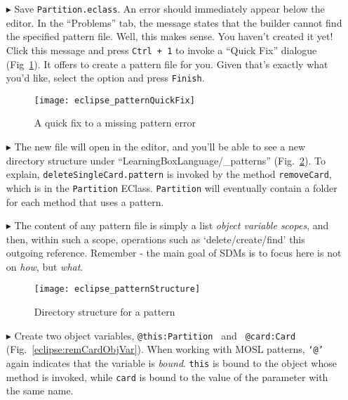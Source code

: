 \begin{itemize}
\item[$\blacktriangleright$] Save \texttt{Partition.eclass}. An error should immediately appear below the editor. In the ``Problems'' tab, the message
states that the builder cannot find the specified pattern file. Well, this makes sense. You haven't created it yet! Click this message and press \texttt{Ctrl +
1} to invoke a ``Quick Fix'' dialogue (Fig~\ref{eclipse:quickFix}). It offers to create a pattern file for you. Given that's exactly what you'd like, select the
option and press \texttt{Finish}.

\vspace{0.5cm}

\begin{figure}[htp]
\begin{center}
  \texttt{[image: eclipse\_patternQuickFix]}
  \caption{A quick fix to a missing pattern error}
  \label{eclipse:quickFix}
\end{center}
\end{figure}

\item[$\blacktriangleright$] The new file will open in the editor, and you'll be able to see a new directory structure under ``LearningBoxLanguage/\_patterns''
(Fig.~\ref{eclipse:pattStruct}). To explain, \texttt{deleteSingleCard.pattern} is invoked by the method \texttt{removeCard}, which is in the \texttt{Partition}
EClass. \texttt{Partition} will eventually contain a folder for each method that uses a pattern.

\vspace{0.5cm}

\item[$\blacktriangleright$] The content of any pattern file is simply a list \emph{object variable scopes}, and then,
within such a scope, operations such as `delete/create/find' this outgoing reference. Remember - the main goal of SDMs is to focus here is not on \emph{how},
but \emph{what}.

\newpage

\begin{figure}[htp]
\begin{center}
  \texttt{[image: eclipse\_patternStructure]}
  \caption{Directory structure for a pattern}
  \label{eclipse:pattStruct}
\end{center}
\end{figure}

\item[$\blacktriangleright$] Create two object variables, \texttt{@this:Partition } and \texttt{ @card:Card}\\ (Fig.~\ref{eclipse:remCardObjVar}). When working
with MOSL patterns, \texttt{`@'} again indicates that the variable is \emph{bound}. \texttt{this} is bound to the object whose method is invoked,
while \texttt{card} is bound to the value of the parameter with the same name.


\end{itemize}
